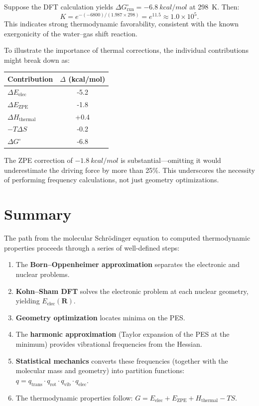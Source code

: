 \documentclass[11pt]{article}
\numberwithin{equation}{section}
\begin{document}
Suppose the DFT calculation yields $\Delta G^\circ_\text{rxn} = \SI{-6.8}{kcal/mol}$ at \SI{298}{K}. Then:
\begin{equation}
K = e^{-(-6800)/(1.987 \times 298)} = e^{11.5} \approx 1.0 \times 10^5.
\end{equation}
This indicates strong thermodynamic favorability, consistent with the known exergonicity of the water--gas shift reaction.

To illustrate the importance of thermal corrections, the individual contributions might break down as:
\begin{center}
\begin{tabular}{lS[table-format=-2.1]}
\toprule
\textbf{Contribution} & {$\Delta$ (kcal/mol)} \\
\midrule
$\Delta E_\text{elec}$ & -5.2 \\
$\Delta E_\text{ZPE}$ & -1.8 \\
$\Delta H_\text{thermal}$ & +0.4 \\
$-T\Delta S$ & -0.2 \\
\midrule
$\Delta G^\circ$ & -6.8 \\
\bottomrule
\end{tabular}
\end{center}

The ZPE correction of $\SI{-1.8}{kcal/mol}$ is substantial---omitting it would underestimate the driving force by more than 25\%. This underscores the necessity of performing frequency calculations, not just geometry optimizations.


\section{Summary}
\label{sec:summary}

The path from the molecular Schr\"{o}dinger equation to computed thermodynamic properties proceeds through a series of well-defined steps:

\begin{enumerate}
\item The \textbf{Born--Oppenheimer approximation} separates the electronic and nuclear problems.
\item \textbf{Kohn--Sham DFT} solves the electronic problem at each nuclear geometry, yielding $E_\text{elec}(\mathbf{R})$.
\item \textbf{Geometry optimization} locates minima on the PES.
\item The \textbf{harmonic approximation} (Taylor expansion of the PES at the minimum) provides vibrational frequencies from the Hessian.
\item \textbf{Statistical mechanics} converts these frequencies (together with the molecular mass and geometry) into partition functions: $q = q_\text{trans}\cdot q_\text{rot}\cdot q_\text{vib}\cdot q_\text{elec}$.
\item The thermodynamic properties follow: $G = E_\text{elec} + E_\text{ZPE} + H_\text{thermal} - TS$.
\end{enumerate}
\end{document}
